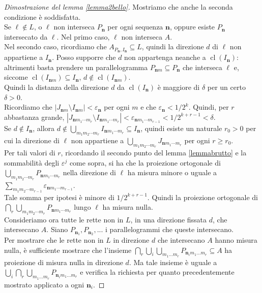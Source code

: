 \documentclass[a4paper, twoside]{article}
\newcommand{\e}{\varepsilon}
\newcommand{\<}{\langle}
\renewcommand{\>}{\rangle}
\begin{document}
\begin{proof}[Dimostrazione del lemma \ref{lemma2bello}]
Mostriamo che anche la seconda condizione è soddisfatta.\\
Se $\ell \notin L$, o $\ell$ non interseca $P_{\mathbf{n}}$ per ogni sequenza $\mathbf{n}$, oppure esiste $P_\mathbf{n}$ intersecato da $\ell$. Nel primo caso, $\ell$ non interseca $A$.\\
Nel secondo caso, ricordiamo che $A_{P_\mathbf{n},I_\mathbf{n}} \subseteq L$, quindi la direzione $d$ di $\ell$ non appartiene a $I_{\mathbf{n}}$. Posso supporre che $d$ non appartenga neanche a $\operatorname{cl}(I_\mathbf{n})$: altrimenti basta prendere un parallelogramma $P_{\mathbf{n}m} \subseteq P_{\mathbf{n}}$ che interseca $\ell$ e, siccome $\operatorname{cl}(I_{\mathbf{n}m}) \subseteq I_{\mathbf{n}}$, $d \not \in \operatorname{cl}(I_{\mathbf{n}m})$.\\
Quindi la distanza della direzione $d$ da $\operatorname{cl}(I_\mathbf{n})$ è maggiore di $\delta$ per un certo $\delta >0$.\\
Ricordiamo che $|J_{\mathbf{n}m} \setminus I_{\mathbf{n}m}| < \e_{\mathbf{n}}$ per ogni $m$ e che $\e_{\mathbf{n}} < 1/2^k$. Quindi, per $r$ abbastanza grande, $|J_{\mathbf{n} m_{1} \cdots m_{r}} \setminus I_{\mathbf{n} m_{1} \cdots m_{r}}| < \e_{\mathbf{n} m_{1} \cdots m_{r-1}} < 1/2^{k+r-1}<\delta$.\\
Se $d \not \in I_{\mathbf{n}} $, allora $d \not \in \bigcup_{m_{1} m_{2} \cdots m_{r}} I_{\mathbf{n} m_{1} \cdots m_{r}} \subseteq I_{\mathbf{n}}$, quindi esiste un naturale $r_0 >0$ per cui la direzione di $\ell$ non appartiene a $\bigcup_{m_{1} m_{2} \cdots m_{r}} J_{\mathbf{n} m_{1} \cdots m_{r}}$ per ogni $r \geq r_0$.\\
Per tali valori di $r$, ricordando il secondo punto del lemma \ref{lemmabrutto} e la sommabilità degli $\e^j$ come sopra, si ha che la proiezione ortogonale di $\bigcup_{m_{1} m_{2} \cdots m_{r}} P_{\mathbf{n} m_{1} \cdots m_{r}}$ nella direzione di $\ell$ ha misura minore o uguale a $\sum_{m_{1} m_{2} \cdots m_{r-1}} \varepsilon_{\mathbf{n} m_{1} \cdots m_{r-1}}$.\\
Tale somma per ipotesi è minore di $1/2^{k+r-1}$. Quindi la proiezione ortogonale di $\bigcap_{r} \bigcup_{m_{1} m_{2} \cdots m_{r}} P_{\mathbf{n} m_{1} \cdots m_{r}} $ lungo $\ell$ ha misura nulla.\\
Consideriamo ora tutte le rette non in $L$, in una direzione fissata $d$, che intersecano $A$. Siano $P_{\mathbf{n}_1}, P_{\mathbf{n}_2},...$ i parallelogrammi che queste intersecano.\\
Per mostrare che le rette non in $L$ in direzione $d$ che intersecano $A$ hanno misura nulla, è sufficiente mostrare che l'insieme $\bigcap_r \bigcup_i \bigcup_{m_1 ... m_r}  P_{\mathbf{n}_i m_{1} ...m_{r} } \subseteq A$ ha proiezione di misura nulla in direzione $d$. Ma tale insieme è uguale a $\bigcup_i \bigcap_r \bigcup_{m_1 ... m_r}  P_{\mathbf{n}_i m_{1} ...m_{r} }$ e verifica la richiesta per quanto precedentemente mostrato applicato a ogni $\mathbf{n}_i$.
\end{proof}
\end{document}
